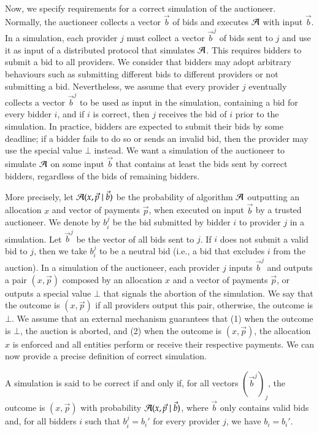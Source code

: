 Now, we specify requirements for a correct simulation of the auctioneer.
Normally, the auctioneer collects a vector $\vec{b}$
of bids and executes $\mathcal{A}$ with input $\vec{b}$.
In a simulation, each provider $j$ must collect a vector $\vec{b}^j$
of bids sent to $j$ and use it as input of a distributed protocol
that simulates $\mathcal{A}$. This requires bidders to submit a bid
to all providers. We consider that bidders may adopt arbitrary behaviours
such as submitting different bids to different providers or not submitting a bid.
Nevertheless, we assume that every provider $j$
eventually collects a vector $\vec{b}^j$ to be used as input in the simulation,
containing a bid for every bidder $i$, and if $i$ is correct,
then $j$ receives the bid of $i$ prior to the simulation.
In practice, bidders are expected to submit their bids by some deadline;
if a bidder fails to do so or sends an invalid bid,
then the provider may use the special value $\bot$ instead.
We want a simulation of the auctioneer to simulate $\mathcal{A}$ on some 
input $\vec{b}$ that contains at least the bids sent by correct bidders,
regardless of the bids of remaining bidders.

More precisely, let $\mathcal{A}(x,\vec{p} \mid \vec{b})$ be the probability
of algorithm $\mathcal{A}$ outputting an allocation $x$ and vector of payments $\vec{p}$,
when executed on input $\vec{b}$ by a trusted auctioneer.
We denote by $b_i^j$ be the bid submitted by
bidder $i$ to provider $j$ in a simulation.
Let $\vec{b}^j$ be the vector of all bids sent to $j$.
If $i$ does not submit a valid bid to $j$, then we take $b_i^j$
to be a neutral bid (i.e., a bid that excludes $i$ from the auction).
In a simulation of the auctioneer, each provider $j$ inputs $\vec{b}^j$
and outputs a pair $(x,\vec{p})$ composed by an allocation $x$
and a vector of payments $\vec{p}$, or outputs a special value $\bot$
that signals the abortion of the simulation.
We say that the outcome is $(x,\vec{p})$ if all providers output this pair,
otherwise, the outcome is $\bot$.
We assume that an external mechanism guarantees that
(1) when the outcome is $\bot$, the auction is aborted,
and (2) when the outcome is $(x,\vec{p})$, the allocation $x$
is enforced and all entities perform or receive their respective payments.
We can now provide a precise definition of correct simulation.

\begin{definition}
A simulation is said to be correct if and only if,
for all vectors $(\vec{b}^j)_j$, the outcome is $(x,\vec{p})$ with
probability $\mathcal{A}(x,\vec{p} \mid \vec{b})$, where $\vec{b}$
only contains valid bids and, for all bidders $i$ such that 
$b_i^j = b_i'$ for every provider $j$, we have $b_i = b_i'$.
\end{definition}

